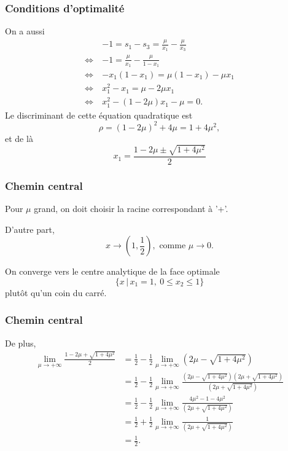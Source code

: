 \documentclass[usepdftitle=false, aspectratio=169]{beamer}
\begin{document}
\begin{frame}
\frametitle{Conditions d'optimalité}

On a aussi
\begin{align*}
& -1 = s_1 - s_3 = \frac{\mu}{x_1} - \frac{\mu}{x_3} \\
\Leftrightarrow\ & -1 = \frac{\mu}{x_1} - \frac{\mu}{1-x_1} \\
\Leftrightarrow\ & -x_1(1-x_1) = \mu(1-x_1) - \mu x_1 \\
\Leftrightarrow\ & x_1^2 - x_1 = \mu - 2\mu x_1 \\
\Leftrightarrow\ & x_1^2 - (1-2\mu) x_1 -\mu = 0.
\end{align*}
Le discriminant de cette équation quadratique est
\[
\rho = (1-2\mu)^2 + 4\mu = 1+ 4\mu^2,
\]
et de là
\[
x_1 = \frac{1-2\mu \pm \sqrt{1+4\mu^2}}{2}
\]

\end{frame}

\begin{frame}
\frametitle{Chemin central}

Pour $\mu$ grand, on doit choisir la racine correspondant à '+'.

D'autre part,
\[
x \rightarrow \left( 1, \frac{1}{2} \right), \mbox{ comme } \mu \rightarrow 0.
\]

\mbox{}

On converge vers le centre analytique de la face optimale
\[
\lbrace x \,|\, x_1 = 1,\ 0 \leq x_2 \leq 1\rbrace
\]
plutôt qu'un coin du carré.

\end{frame}

\begin{frame}
\frametitle{Chemin central}

De plus,
\begin{align*}
\lim_{\mu \rightarrow +\infty} \frac{1-2\mu + \sqrt{1+4\mu^2}}{2}
&= \frac{1}{2} - \frac{1}{2} \lim_{\mu \rightarrow +\infty} \left( 2\mu - \sqrt{1+4\mu^2} \right) \\
&= \frac{1}{2} - \frac{1}{2} \lim_{\mu \rightarrow +\infty} \frac{\left( 2\mu - \sqrt{1+4\mu^2} \right)\left( 2\mu + \sqrt{1+4\mu^2} \right)}{\left( 2\mu + \sqrt{1+4\mu^2} \right)} \\
&= \frac{1}{2} - \frac{1}{2} \lim_{\mu \rightarrow +\infty} \frac{4\mu^2 - 1 -4\mu^2}{\left( 2\mu + \sqrt{1+4\mu^2} \right)} \\
&= \frac{1}{2} + \frac{1}{2} \lim_{\mu \rightarrow +\infty} \frac{1}{\left( 2\mu + \sqrt{1+4\mu^2} \right)} \\
& = \frac{1}{2}.
\end{align*}

\end{frame}
\end{document}
